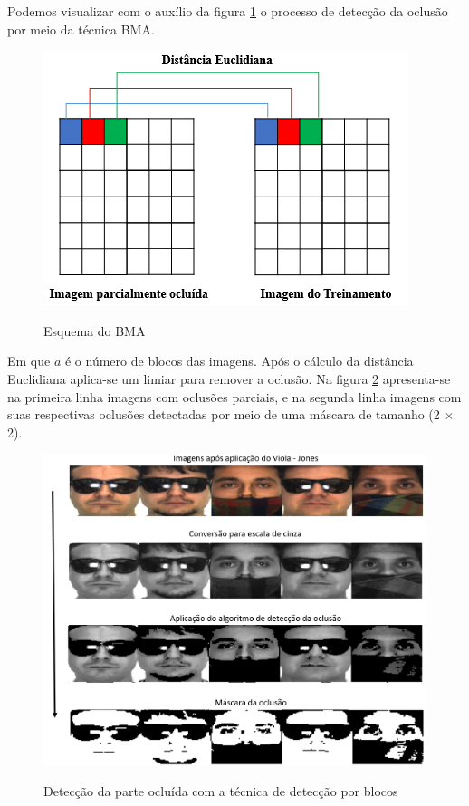 Podemos visualizar com o auxílio da figura \ref{fig:esquema_bma} o processo de detecção da oclusão por meio da técnica BMA.


\begin{figure}[H]
\centering
\caption{Esquema do BMA}
\includegraphics[scale = 0.8]{imgs/bma.png}
\label{fig:esquema_bma}
\end{figure}


Em que $a$ é o número de blocos das imagens. Após o cálculo da distância Euclidiana aplica-se um limiar para remover a oclusão. Na figura \ref{fig:detec_blocos} apresenta-se na primeira linha imagens com oclusões parciais, e na segunda linha imagens com suas respectivas oclusões detectadas por meio de uma máscara de tamanho (2 $\times$ 2).

\begin{figure}[H]
\centering
\caption{Detecção da parte ocluída com a técnica de detecção por blocos}
\includegraphics[scale = 0.40]{imgs3/deteccoes}
\label{fig:detec_blocos}
\end{figure}


